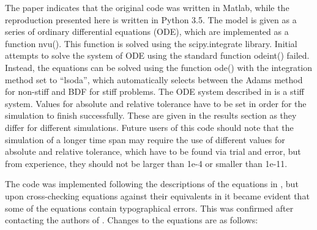 \documentclass[10pt,a4paper,onecolumn]{article}
\begin{document}
The paper indicates that the original code was written in Matlab, while
the reproduction presented here is written in Python 3.5. The model is
given as a series of ordinary differential equations (ODE), which are
implemented as a function nvu(). This function is solved using the
scipy.integrate library. Initial attempts to solve the system of ODE
using the standard function odeint() failed. Instead, the equations can
be solved using the function ode() with the integration method set to
``lsoda'', which automatically selects between the Adams method for
non-stiff and BDF for stiff problems. The ODE system described in
\autocite{Witthoft2012} is a stiff system. Values for absolute and
relative tolerance have to be set in order for the simulation to finish
successfully. These are given in the results section as they differ for
different simulations. Future users of this code should note that the
simulation of a longer time span may require the use of different values
for absolute and relative tolerance, which have to be found via trial
and error, but from experience, they should not be larger than 1e-4 or
smaller than 1e-11.

The code was implemented following the descriptions of the equations in
\autocite{Witthoft2012}, but upon cross-checking equations against their
equivalents in
\autocite{Bennett2008}\autocite{Farr2011}\autocite{Gonzalez1994} it
became evident that some of the equations contain typographical errors.
This was confirmed after contacting the authors of
\autocite{Witthoft2012}. Changes to the equations are as follows:
\end{document}
